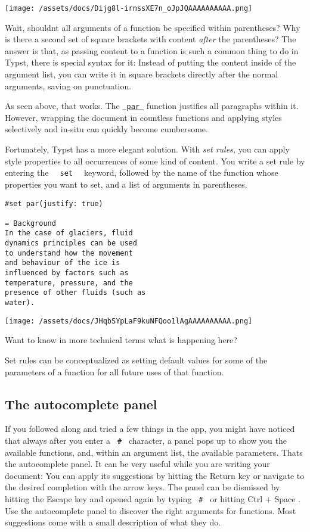 \texttt{[image: /assets/docs/Dijg8l-irnssXE7n\_oJpJQAAAAAAAAAA.png]}

Wait, shouldn\textquotesingle t all arguments of a function be specified
within parentheses? Why is there a second set of square brackets with
content \emph{after} the parentheses? The answer is that, as passing
content to a function is such a common thing to do in Typst, there is
special syntax for it: Instead of putting the content inside of the
argument list, you can write it in square brackets directly after the
normal arguments, saving on punctuation.

As seen above, that works. The
\href{/docs/reference/model/par/}{\texttt{\ par\ }} function justifies
all paragraphs within it. However, wrapping the document in countless
functions and applying styles selectively and in-situ can quickly become
cumbersome.

Fortunately, Typst has a more elegant solution. With \emph{set rules,}
you can apply style properties to all occurrences of some kind of
content. You write a set rule by entering the
\texttt{\ }{\texttt{\ set\ }}\texttt{\ } keyword, followed by the name
of the function whose properties you want to set, and a list of
arguments in parentheses.

\begin{verbatim}
#set par(justify: true)

= Background
In the case of glaciers, fluid
dynamics principles can be used
to understand how the movement
and behaviour of the ice is
influenced by factors such as
temperature, pressure, and the
presence of other fluids (such as
water).
\end{verbatim}

\texttt{[image: /assets/docs/JHqbSYpLaF9kuNFQoo1lAgAAAAAAAAAA.png]}

Want to know in more technical terms what is happening here?

Set rules can be conceptualized as setting default values for some of
the parameters of a function for all future uses of that function.

\subsection{The autocomplete panel}\label{autocomplete}

If you followed along and tried a few things in the app, you might have
noticed that always after you enter a \texttt{\ \#\ } character, a panel
pops up to show you the available functions, and, within an argument
list, the available parameters. That\textquotesingle s the autocomplete
panel. It can be very useful while you are writing your document: You
can apply its suggestions by hitting the Return key or navigate to the
desired completion with the arrow keys. The panel can be dismissed by
hitting the Escape key and opened again by typing \texttt{\ \#\ } or
hitting { Ctrl } + { Space } . Use the autocomplete panel to discover
the right arguments for functions. Most suggestions come with a small
description of what they do.

